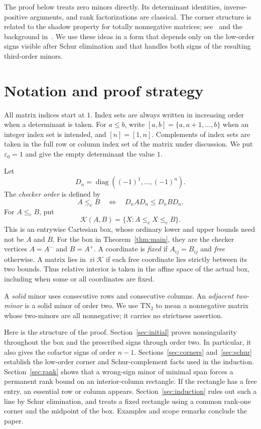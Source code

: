 \documentclass[11pt]{article}
\theoremstyle{definition}
\theoremstyle{remark}
\numberwithin{equation}{section}
\newcommand{\eps}{\varepsilon}
\newcommand{\K}{\mathcal K}
\newcommand{\chle}{\leq_{\mathrm c}}
\DeclareMathOperator{\diag}{diag}
\DeclareMathOperator{\ri}{ri}
\begin{document}
The proof below treats zero minors directly. Its determinant identities,
inverse-positive arguments, and rank factorizations are classical.
The corner structure is related to the shadow property for totally
nonnegative matrices; see~\cite[Lemma~1.2]{AdmGarloff2013} and the
background in~\cite{FallatJohnson2011,Pinkus2010}. We use these ideas
in a form that depends only on the low-order signs visible after Schur
elimination and that handles both signs of the resulting third-order
minors.

\section{Notation and proof strategy}\label{sec:notation}

All matrix indices start at $1$. Index sets are always written in
increasing order when a determinant is taken. For $a\leq b$, write
$[a,b]=\{a,a+1,\ldots,b\}$ when an integer index set is intended, and
$[n]=[1,n]$. Complements of index sets are taken in the full row or
column index set of the matrix under discussion. We put $\eps_0=1$
and give the empty determinant the value $1$.

Let
\[
 D_n=\diag((-1)^1,\ldots,(-1)^n).
\]
The \emph{checker order} is defined by
\[
 A\chle B\quad\Longleftrightarrow\quad D_nAD_n\leq D_nBD_n.
\]
For $A\chle B$, put
\[
 \K(A,B)=\{X:A\chle X\chle B\}.
\]
This is an entrywise Cartesian box, whose ordinary lower and upper
bounds need not be $A$ and $B$. For the box in
Theorem~\ref{thm:main}, they are the checker vertices $A=A^-$ and
$B=A^+$. A coordinate is \emph{fixed} if $A_{ij}=B_{ij}$ and
\emph{free} otherwise. A matrix lies in $\ri\K$ if each free
coordinate lies strictly between its two bounds. Thus relative interior
is taken in the affine space of the actual box, including when some or
all coordinates are fixed.

A \emph{solid} minor uses consecutive rows and consecutive columns.
An \emph{adjacent two-minor} is a solid minor of order two.
We use $\mathrm{TN}_2$ to mean a nonnegative matrix whose two-minors
are all nonnegative; it carries no strictness assertion.

Here is the structure of the proof. Section~\ref{sec:initial} proves
nonsingularity throughout the box and the prescribed signs through
order two. In particular, it also gives the cofactor signs of order
$n-1$. Sections~\ref{sec:corners} and~\ref{sec:schur} establish the
low-order corner and Schur-complement facts used in the induction.
Section~\ref{sec:rank} shows that a wrong-sign minor of minimal span
forces a permanent rank bound on an interior-column rectangle. If the
rectangle has a free entry, an essential row or column appears.
Section~\ref{sec:induction} rules out such a line by Schur elimination,
and treats a fixed rectangle using a common rank-one corner and the
midpoint of the box. Examples and scope remarks conclude the paper.
\end{document}
